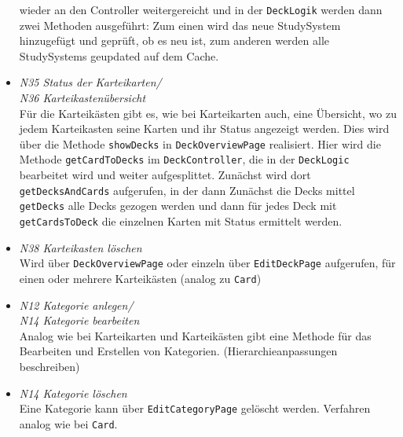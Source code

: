 \documentclass[fontsize=12pt,paper=A4,twoside]{scrartcl}
\begin{document}
\begin{itemize}
    wieder an den Controller weitergereicht und in der \texttt{DeckLogik} werden dann zwei Methoden ausgeführt: Zum einen wird das neue StudySystem hinzugefügt und geprüft, ob es neu ist, zum anderen
    werden alle StudySystems geupdated auf dem Cache.
    \item \textit{N35 Status der Karteikarten/ \\ N36 Karteikastenübersicht}\\ 
    Für die Karteikästen gibt es, wie bei Karteikarten auch, eine Übersicht, wo zu jedem Karteikasten seine Karten und ihr Status angezeigt werden.
    Dies wird über die Methode \texttt{showDecks} in \texttt{DeckOverviewPage} realisiert. Hier wird die Methode \texttt{getCardToDecks} im \texttt{DeckController}, 
    die in der \texttt{DeckLogic} bearbeitet wird und weiter aufgesplittet. Zunächst wird dort \texttt{getDecksAndCards} aufgerufen, in der dann Zunächst
    die Decks mittel \texttt{getDecks} alle Decks gezogen werden und dann für jedes Deck mit \texttt{getCardsToDeck} die einzelnen Karten mit Status
    ermittelt werden.
    \item\textit{ N38 Karteikasten löschen}\\ Wird über \texttt{DeckOverviewPage} oder einzeln über \texttt{EditDeckPage} aufgerufen, für einen oder mehrere Karteikästen (analog zu \texttt{Card})
    \end{itemize}
    \begin{itemize}
        \item \textit{N12 Kategorie anlegen/ \\
         N14 Kategorie bearbeiten}\\
    Analog wie bei Karteikarten und Karteikästen gibt eine Methode für das Bearbeiten und Erstellen von Kategorien. (Hierarchieanpassungen beschreiben)
        \item \textit{N14 Kategorie löschen}\\
    Eine Kategorie kann über \texttt{EditCategoryPage} gelöscht werden. Verfahren analog wie bei \texttt{Card}.
    \end{itemize}
\end{document}
